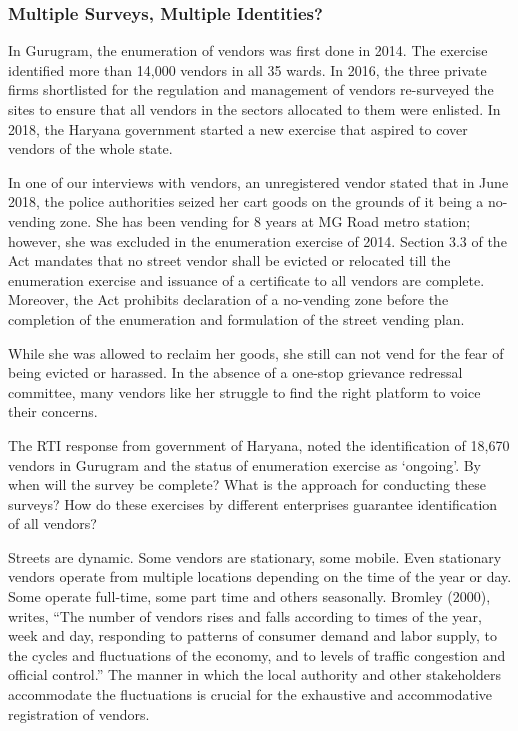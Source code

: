 \documentclass[a4paper, 12pt, twoside]{article}
\begin{document}
\subsubsection{Multiple Surveys, Multiple Identities?}
In Gurugram, the enumeration of vendors was first done in 2014. The exercise identified more than 14,000 vendors in all 35 wards. In 2016, the three private firms shortlisted for the regulation and management of vendors re-surveyed the sites to ensure that all vendors in the sectors allocated to them were enlisted. In 2018, the Haryana government started a new exercise that aspired to cover vendors of the whole state. \\

\begin{mdframed}[backgroundcolor=gray!20]
In one of our interviews with vendors, an unregistered vendor stated that in June 2018, the police authorities seized her cart goods on the grounds of it being a no-vending zone. She has been vending for 8 years at MG Road metro station; however, she was excluded in the enumeration exercise of 2014. Section 3.3 of the Act mandates that no street vendor shall be evicted or relocated till the enumeration exercise and issuance of a certificate to all vendors are complete. Moreover, the Act prohibits declaration of a no-vending zone before the completion of the enumeration and formulation of the street vending plan. 

While she was allowed to reclaim her goods, she still can not vend for the fear of being evicted or harassed. In the absence of a one-stop grievance redressal committee, many vendors like her struggle to find the right platform to voice their concerns.
\end{mdframed}

The RTI response from government of Haryana, noted the identification of 18,670 vendors in Gurugram and the status of enumeration exercise as ‘ongoing’. By when will the survey be complete? What is the approach for conducting these surveys? How do these exercises by different enterprises guarantee identification of all vendors? 

Streets are dynamic. Some vendors are stationary, some mobile. Even stationary vendors operate from multiple locations depending on the time of the year or day. Some operate full-time, some part time and others seasonally. Bromley (2000)\cite{bromleypaper}, writes, “The number of vendors rises and falls according to times of the year, week and day, responding to patterns of consumer demand and labor supply, to the cycles and fluctuations of the economy, and to levels of traffic congestion and official control.” The manner in which the local authority and other stakeholders accommodate the fluctuations is crucial for the exhaustive and accommodative registration of vendors. 
\end{document}

